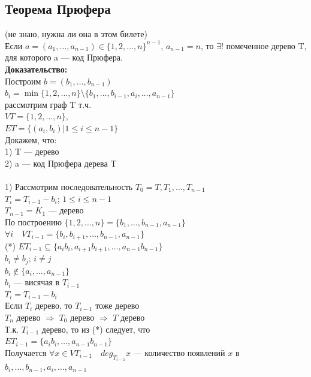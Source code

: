 \documentclass[12pt]{article}
\begin{document}
	\subsection{Теорема Прюфера}
		(не знаю, нужна ли она в этом билете)\\
		Если $a = (a_1,\dotsc,a_{n-1}) \in \{1,2,\dotsc,n\}^{n-1}$, $a_{n-1} = n$, то $\exists!$ помеченное дерево T, для которого a — код Прюфера.\\
		\textbf{Доказательство:}\\
			Построим $b = (b_1,\dotsc,b_{n-1})$\\
			$b_i = \min\{1,2,\dotsc,n\}\setminus\{b_1,\dotsc,b_{i-1},a_i,\dotsc,a_{n-1}\}$\\
			рассмотрим граф T т.ч.\\
			$VT = \{1,2,\dotsc,n\}$,\\
			$ET = \{(a_i,b_i)|1\leqslant i \leqslant n-1\}$\\
			Докажем, что:\\
			1) T — дерево\\
			2) a — код Прюфера дерева T\\\\
			1) Рассмотрим последовательность $T_0 = T,T_1,\dotsc,T_{n-1}$\\
			$T_i = T_{i-1} - b_i$; $1 \leqslant i \leqslant n-1$\\
			$T_{n-1} = K_1$ — дерево\\
			По построению $\{1,2,\dotsc,n\} = \{b_1,\dotsc,b_{n-1},a_{n-1}\}$\\
			$\forall i \quad VT_{i-1} = \{b_i,b_{i+1},\dotsc,b_{n-1},a_{n-1}\}$\\
			(*) $ET_{i-1} \subseteq \{a_ib_i,a_{i+1}b_{i+1},\dotsc,a_{n-1}b_{n-1}\}$\\
			$b_i \neq b_j$; \quad $i \neq j$\\
			$b_i \notin \{a_i,\dotsc,a_{n-1}\}$\\
			$b_i$ — висячая в $T_{i-1}$\\
			$T_{i} = T_{i-1} - b_i$\\
			Если $T_i$ дерево, то $T_{i-1}$ тоже дерево\\
			$T_n$ дерево $\Rightarrow$ $T_0$ дерево $\Rightarrow$ $T$ дерево\\
			Т.к. $T_{i-1}$ дерево, то из (*) следует, что\\
			$ET_{i-1} = \{a_ib_i,\dotsc,a_{n-1}b_{n-1}\}$\\
			Получается $\forall x \in VT_{i-1} \quad deg_{T_{i-1}}x$ — количество появлений $x$ в $b_i,\dotsc,b_{n-1},a_i,\dotsc,a_{n-1}$\\
\end{document}
